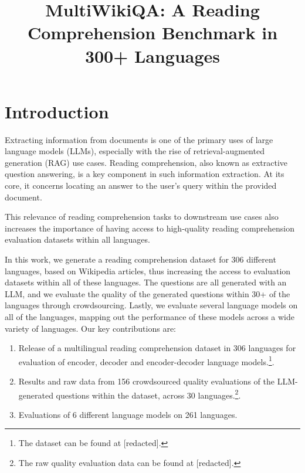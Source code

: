\documentclass[10pt, a4paper]{article}
\title{MultiWikiQA: A Reading Comprehension Benchmark in 300+ Languages}
\begin{document}
\maketitleabstract

\section{Introduction}
Extracting information from documents is one of the primary uses of large language models (LLMs), especially with the rise of retrieval-augmented generation (RAG) use cases. Reading comprehension, also known as extractive question answering, is a key component in such information extraction. At its core, it concerns locating an answer to the user's query within the provided document.

This relevance of reading comprehension tasks to downstream use cases also increases the importance of having access to high-quality reading comprehension evaluation datasets within all languages.

In this work, we generate a reading comprehension dataset for 306 different languages, based on Wikipedia articles, thus increasing the access to evaluation datasets within all of these languages. The questions are all generated with an LLM, and we evaluate the quality of the generated questions within 30+ of the languages through crowdsourcing. Lastly, we evaluate several language models on all of the languages, mapping out the performance of these models across a wide variety of languages. Our key contributions are:

\begin{enumerate}
    \item Release of a multilingual reading comprehension dataset in 306 languages for evaluation of  encoder, decoder and encoder-decoder language models.\footnote{The dataset can be found at [redacted].}.
    \item Results and raw data from 156 crowdsourced quality evaluations of the LLM-generated questions within the dataset, across 30 languages.\footnote{The raw quality evaluation data can be found at [redacted].}.
    \item Evaluations of 6 different language models on 261 languages.
\end{enumerate}
\end{document}
